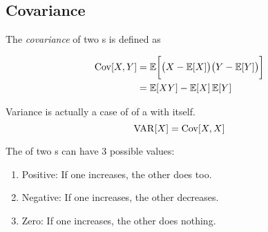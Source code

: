 \subsection{Covariance}\label{subsec:Covariance}
\begin{definition}[Covariance]\label{def:Covariance}
  The \emph{covariance} of two s is defined as
  
  \begin{equation}\label{eq:Covariance}
    \begin{aligned}
      \operatorname{\operatorname{Cov}}[X,Y] &= \operatorname{\operatorname{\mathbb{E}}}\biggl[ \bigl( X - \operatorname{\operatorname{\mathbb{E}}}[X] \bigr) \bigl( Y - \operatorname{\operatorname{\mathbb{E}}}[Y] \bigr) \biggr] \\
      &= \operatorname{\operatorname{\mathbb{E}}}[XY] - \operatorname{\operatorname{\mathbb{E}}}[X] \operatorname{\operatorname{\mathbb{E}}}[Y]
    \end{aligned}
  \end{equation}

  \begin{remark}\label{rmk:Covariance_Variance_Relationship}
    Variance is actually a case of  of a  with itself.
    \begin{equation}\label{eq:Covariance_Variance_Relationship}
      \operatorname{\operatorname{VAR}}[X] = \operatorname{\operatorname{Cov}}[X,X]
    \end{equation}
  \end{remark}
\end{definition}

The  of two s can have 3 possible values:
\begin{enumerate}[noitemsep]
\item Positive: If one  increases, the other does too.
\item Negative: If one  increases, the other decreases.
\item Zero: If one  increases, the other does nothing.
\end{enumerate}

